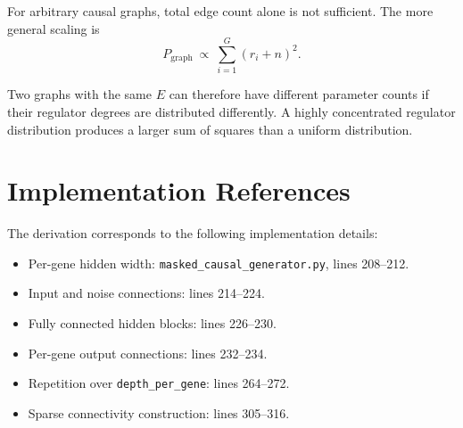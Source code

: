 \documentclass[11pt]{article}
\begin{document}
For arbitrary causal graphs, total edge count alone is not sufficient. The more general scaling is
\begin{equation}
P_{\mathrm{graph}}\ \propto\ \sum_{i=1}^{G}(r_i+n)^2.
\end{equation}

Two graphs with the same $E$ can therefore have different parameter counts if their regulator
degrees are distributed differently. A highly concentrated regulator distribution produces a
larger sum of squares than a uniform distribution.

\section{Implementation References}

The derivation corresponds to the following implementation details:

\begin{itemize}
\item Per-gene hidden width: \texttt{masked\_causal\_generator.py}, lines 208--212.
\item Input and noise connections: lines 214--224.
\item Fully connected hidden blocks: lines 226--230.
\item Per-gene output connections: lines 232--234.
\item Repetition over \texttt{depth\_per\_gene}: lines 264--272.
\item Sparse connectivity construction: lines 305--316.
\end{itemize}
\end{document}
